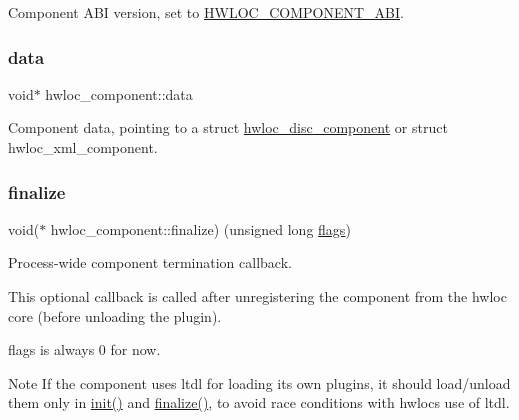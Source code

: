 Component A\+BI version, set to \hyperlink{a00182_gaac5bc1f46f55e10ef0141a68ce70e21f}{H\+W\+L\+O\+C\+\_\+\+C\+O\+M\+P\+O\+N\+E\+N\+T\+\_\+\+A\+BI}. 

\mbox{\label{a00378_a4b8cffd1d943c29fdc102b841b8598d4}} 
\subsubsection{\texorpdfstring{data}{data}}
{\footnotesize\ttfamily void$\ast$ hwloc\+\_\+component\+::data}



Component data, pointing to a struct \hyperlink{a00366}{hwloc\+\_\+disc\+\_\+component} or struct hwloc\+\_\+xml\+\_\+component. 

\mbox{\label{a00378_a4612015451a1c706e8ba19114cb8baae}} 
\subsubsection{\texorpdfstring{finalize}{finalize}}
{\footnotesize\ttfamily void($\ast$ hwloc\+\_\+component\+::finalize) (unsigned long \hyperlink{a00378_ab8043c5b4cc0e81aabba586ccb194335}{flags})}



Process-\/wide component termination callback. 

This optional callback is called after unregistering the component from the hwloc core (before unloading the plugin).

{\ttfamily flags} is always 0 for now.

\begin{DoxyNote}{Note}
If the component uses ltdl for loading its own plugins, it should load/unload them only in \hyperlink{a00378_aea613546886d9b8221cadba920fe3ebc}{init()} and \hyperlink{a00378_a4612015451a1c706e8ba19114cb8baae}{finalize()}, to avoid race conditions with hwloc\textquotesingle{}s use of ltdl. 
\end{DoxyNote}
\mbox{\label{a00378_ab8043c5b4cc0e81aabba586ccb194335}} 

